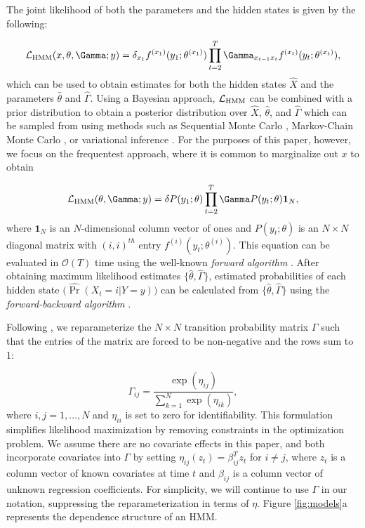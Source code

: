 The joint likelihood of both the parameters and the hidden states is given by the following:

\[\calL_{\text{HMM}}(x,\theta,\Gamma;y) = \delta_{x_1} f^{(x_1)}(y_1; \theta^{(x_1)}) \prod_{t=2}^T \Gamma_{x_{t-1} x_t} f^{(x_t)}(y_t; \theta^{(x_t)}),\]
%
which can be used to obtain estimates for both the hidden states $\hat X$ and the parameters $\hat \theta$ and $\hat \Gamma$. Using a Bayesian approach, $\mathcal{L}_{\text{HMM}}$ can be combined with a prior distribution to obtain a posterior distribution over $\hat X$, $\hat \theta$, and $\hat \Gamma$ which can be sampled from using methods such as Sequential Monte Carlo \citep{Douc:2011b}, Markov-Chain Monte Carlo \citep{Scott:2002}, or variational inference \citep{Foti:2014}. For the purposes of this paper, however, we focus on the frequentest approach, where it is common to marginalize out $x$ to obtain

\[\calL_{\text{HMM}}(\theta,\Gamma;y) = \delta P(y_1;\theta) \prod_{t=2}^T \Gamma P(y_t;\theta) \mathbf{1}_N,\]
%
where $\mathbf{1}_N$ is an $N$-dimensional column vector of ones and $P(y_t;\theta)$ is an $N \times N$ diagonal matrix with $(i,i)^{th}$ entry $f^{(i)}(y_t; \theta^{(i)})$. This equation can be evaluated in $\mathcal{O}(T)$ time using the well-known \textit{forward algorithm} \citep{Zucchini:2016}. 
After obtaining maximum likelihood estimates $\{\hat \theta, \hat \Gamma\}$, estimated probabilities of each hidden state $\big(\hat{\Pr}(X_t = i|Y = y)\big)$ can be calculated from $\{\hat \theta,\hat \Gamma\}$ using the \textit{forward-backward algorithm} \citep{Zucchini:2016}.
%

Following \citet{Barajas:2017}, we reparameterize the $N \times N$ transition probability matrix $\Gamma$ such that the entries of the matrix are forced to be non-negative and the rows sum to 1:

\[
\Gamma_{ij} = \frac{\exp(\eta_{ij})}{\sum_{k=1}^N \exp(\eta_{ik})}, 
\]
%
where $i,j = 1,\ldots,N$ and $\eta_{ii}$ is set to zero for identifiability. This formulation simplifies likelihood maximization by removing constraints in the optimization problem. We assume there are no covariate effects in this paper, \cite{DeSouza:2017} and \citet{Adam:2019} both incorporate covariates into $\Gamma$ by setting $\eta_{ij}(z_t) = \beta_{ij}^T z_t$ for $i \neq j$, where $z_t$ is a column vector of known covariates at time $t$ and $\beta_{ij}$ is a column vector of unknown regression coefficients. For simplicity, we will continue to use $\Gamma$ in our notation, suppressing the reparameterization in terms of $\eta$. Figure \ref{fig:models}a represents the dependence structure of an HMM.

